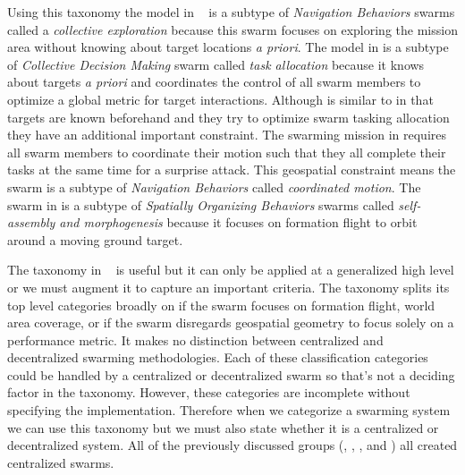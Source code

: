 Using this taxonomy the model in ~\textcite{jin} is a subtype of \textit{Navigation Behaviors} swarms called a \textit{collective exploration} because this swarm focuses on exploring the mission area without knowing about target locations \textit{a priori}.  The model in \textcite{bellingham} is a subtype of \textit{Collective Decision Making} swarm called \textit{task allocation}  because it knows about targets \textit{a priori} and coordinates the control of all swarm members to optimize a global metric for target interactions.  Although \textcite{beard} is similar to \textcite{bellingham} in that targets are known beforehand and they try to optimize swarm tasking allocation they have an additional important constraint.  The swarming mission in \textcite{beard} requires all swarm members to coordinate their motion such that they all complete their tasks at the same time for a surprise attack. This geospatial constraint means the swarm is a subtype of \textit{Navigation Behaviors} called \textit{coordinated motion}.  The swarm in \textcite{wheeler} is a subtype of \textit{Spatially Organizing Behaviors} swarms called \textit{self-assembly and morphogenesis} because it focuses on formation flight to orbit around a moving ground target. %

The taxonomy in ~\textcite{iridia} is useful but it can only be applied at a generalized high level or we must augment it to capture an important criteria.  The taxonomy splits its top level categories broadly on if the swarm focuses on formation flight, world area coverage, or if the swarm disregards geospatial geometry to focus solely on a performance metric.  It makes no distinction between centralized and decentralized swarming methodologies.  Each of these classification categories could be handled by a centralized or decentralized swarm so that's not a deciding factor in the taxonomy.  However, these categories are incomplete without specifying the implementation.  Therefore when we categorize a swarming system we can use this taxonomy but we must also state whether it is a centralized or decentralized system.  All of the previously discussed groups (\textcite{jin}, \textcite{bellingham}, \textcite{beard}, and \textcite{wheeler})  all created centralized swarms.

